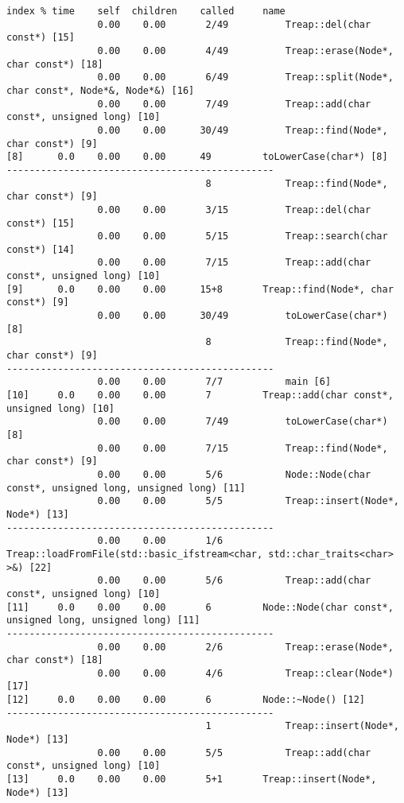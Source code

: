 \documentclass[12pt]{article}
\begin{document}
\begin{lstlisting}[breaklines]
index % time    self  children    called     name
                0.00    0.00       2/49          Treap::del(char const*) [15]
                0.00    0.00       4/49          Treap::erase(Node*, char const*) [18]
                0.00    0.00       6/49          Treap::split(Node*, char const*, Node*&, Node*&) [16]
                0.00    0.00       7/49          Treap::add(char const*, unsigned long) [10]
                0.00    0.00      30/49          Treap::find(Node*, char const*) [9]
[8]      0.0    0.00    0.00      49         toLowerCase(char*) [8]
-----------------------------------------------
                                   8             Treap::find(Node*, char const*) [9]
                0.00    0.00       3/15          Treap::del(char const*) [15]
                0.00    0.00       5/15          Treap::search(char const*) [14]
                0.00    0.00       7/15          Treap::add(char const*, unsigned long) [10]
[9]      0.0    0.00    0.00      15+8       Treap::find(Node*, char const*) [9]
                0.00    0.00      30/49          toLowerCase(char*) [8]
                                   8             Treap::find(Node*, char const*) [9]
-----------------------------------------------
                0.00    0.00       7/7           main [6]
[10]     0.0    0.00    0.00       7         Treap::add(char const*, unsigned long) [10]
                0.00    0.00       7/49          toLowerCase(char*) [8]
                0.00    0.00       7/15          Treap::find(Node*, char const*) [9]
                0.00    0.00       5/6           Node::Node(char const*, unsigned long, unsigned long) [11]
                0.00    0.00       5/5           Treap::insert(Node*, Node*) [13]
-----------------------------------------------
                0.00    0.00       1/6           Treap::loadFromFile(std::basic_ifstream<char, std::char_traits<char> >&) [22]
                0.00    0.00       5/6           Treap::add(char const*, unsigned long) [10]
[11]     0.0    0.00    0.00       6         Node::Node(char const*, unsigned long, unsigned long) [11]
-----------------------------------------------
                0.00    0.00       2/6           Treap::erase(Node*, char const*) [18]
                0.00    0.00       4/6           Treap::clear(Node*) [17]
[12]     0.0    0.00    0.00       6         Node::~Node() [12]
-----------------------------------------------
                                   1             Treap::insert(Node*, Node*) [13]
                0.00    0.00       5/5           Treap::add(char const*, unsigned long) [10]
[13]     0.0    0.00    0.00       5+1       Treap::insert(Node*, Node*) [13]

\end{lstlisting}
\end{document}
